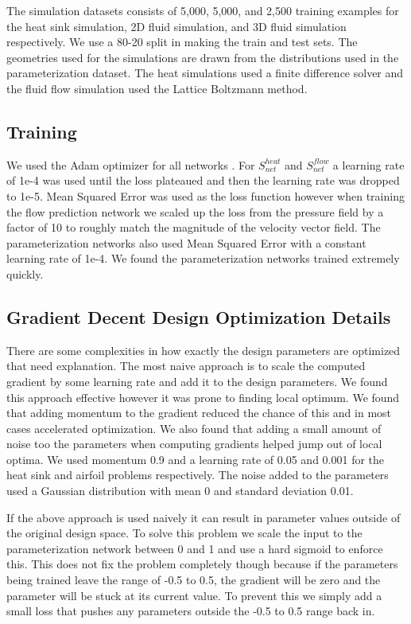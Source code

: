 \documentclass{article} %
\begin{document}
The simulation datasets consists of 5,000, 5,000, and 2,500 training examples for the heat sink simulation, 2D fluid simulation, and 3D fluid simulation respectively. We use a 80-20 split in making the train and test sets. The geometries used for the simulations are drawn from the distributions used in the parameterization dataset. The heat simulations used a finite difference solver and the fluid flow simulation used the Lattice Boltzmann method. 

\subsection{Training}

We used the Adam optimizer for all networks \citep{kingma2014adam}. For $S^{heat}_{net}$ and $S^{flow}_{net}$ a learning rate of 1e-4 was used until the loss plateaued and then the learning rate was dropped to 1e-5. Mean Squared Error was used as the loss function however when training the flow prediction network we scaled up the loss from the pressure field by a factor of 10 to roughly match the magnitude of the velocity vector field. The parameterization networks also used Mean Squared Error with a constant learning rate of 1e-4. We found the parameterization networks trained extremely quickly.

\subsection{Gradient Decent Design Optimization Details}

There are some complexities in how exactly the design parameters are optimized that need explanation. The most naive approach is to scale the computed gradient by some learning rate and add it to the design parameters. We found this approach effective however it was prone to finding local optimum. We found that adding momentum to the gradient reduced the chance of this and in most cases accelerated optimization. We also found that adding a small amount of noise too the parameters when computing gradients helped jump out of local optima. We used momentum 0.9 and a learning rate of 0.05 and 0.001 for the heat sink and airfoil problems respectively. The noise added to the parameters used a Gaussian distribution with mean 0 and standard deviation 0.01.

If the above approach is used naively it can result in parameter values outside of the original design space. To solve this problem we scale the input to the parameterization network between 0 and 1 and use a hard sigmoid to enforce this. This does not fix the problem completely though because if the parameters being trained leave the range of -0.5 to 0.5, the gradient will be zero and the parameter will be stuck at its current value. To prevent this we simply add a small loss that pushes any parameters outside the -0.5 to 0.5 range back in.
\end{document}
